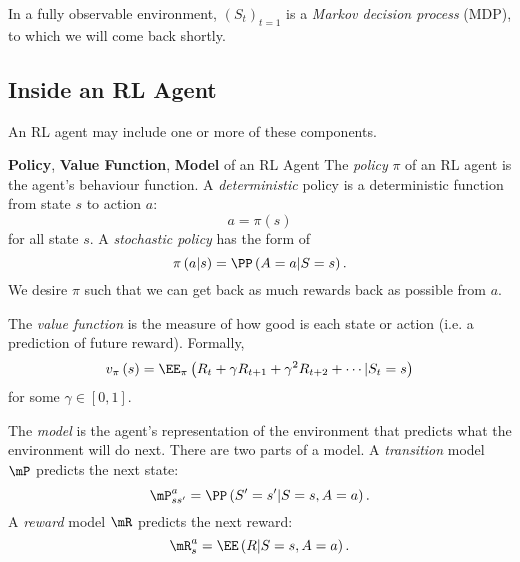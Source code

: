 \documentclass[RL]{subfile}
\begin{document}
    \np In a fully observable environment, $\left( S_{t} \right)^{}_{t=1}$ is a \textit{Markov decision process} (MDP), to which we will come back shortly.

    \subsection{Inside an RL Agent}
    
    \np An RL agent may include one or more of these components.

    \begin{definition}{\textbf{Policy}, \textbf{Value Function}, \textbf{Model} of an RL Agent}
        The \emph{policy} $\pi$ of an RL agent is the agent's behaviour function. A \emph{deterministic} policy is a deterministic function from state $s$ to action $a$:
        \begin{equation*}
            a = \pi\left( s \right)
        \end{equation*}
        for all state $s$. A \emph{stochastic policy} has the form of 
        \begin{equation*}
            \pi\left( a|s \right) = \PP\left( A=a|S=s \right).
        \end{equation*}
        We desire $\pi$ such that we can get back as much rewards back as possible from $a$.

        The \emph{value function} is the measure of how good is each state or action (i.e. a prediction of future reward). Formally,
        \begin{equation*}
            v_{\pi}\left( s \right) = \EE_{\pi}\left( R_t + \gamma R_{t+1} + \gamma^{2} R_{t+2} + \cdots | S_t = s  \right)
        \end{equation*}
        for some $\gamma\in\left[ 0,1 \right]$.\footnotemark[1]

        The \emph{model} is the agent's representation of the environment that predicts what the environment will do next. There are two parts of a model. A \emph{transition} model $\mP$ predicts the next state:
        \begin{equation*}
            \mP^a_{ss'} = \PP\left( S'=s'| S=s, A=a \right).
        \end{equation*}
        A \emph{reward} model $\mR$ predicts the next reward:
        \begin{equation*}
            \mR^a_s = \EE\left( R| S=s, A=a \right).
        \end{equation*}
        
        \noindent
        \begin{minipage}{\textwidth}
        \end{minipage}
    \end{definition}
\end{document}
